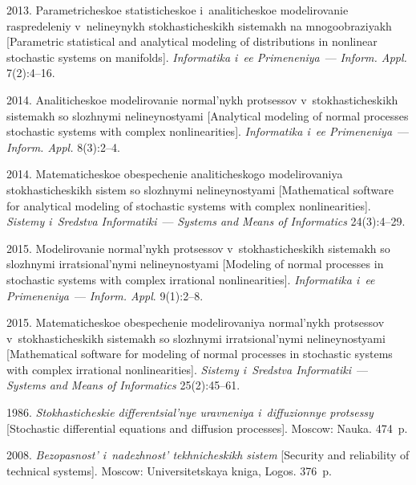 \begin{multicols}{2}
{{\begin{thebibliography}{99}
 2013.
Parametricheskoe statisticheskoe i~analiticheskoe modelirovanie raspredeleniy
v~nelineynykh stokhasticheskikh sistemakh na mnogo\-ob\-ra\-zi\-yakh [Parametric
statistical and analytical modeling of distributions in nonlinear stochastic
systems on manifolds]. \textit{Informatika i~ee Primeneniya}~---
\textit{Inform. Appl.} 7(2):4--16.


 2014.
Analiticheskoe modelirovanie normal'nykh protsessov v~sto\-kha\-sti\-che\-skikh sistemakh
so slozhnymi nelineynostyami [Analytical modeling of normal processes stochastic
systems with complex nonlinearities]. \textit{Informatika i~ee Primeneniya}~---
\textit{Inform. Appl.} 8(3):2--4.

 2014.
Matematicheskoe obespechenie analiticheskogo modelirovaniya sto\-kha\-sti\-che\-skikh
sistem so slozhnymi nelineynostyami [Mathematical software for analytical
modeling of stochastic systems with complex nonlinearities].
\textit{Sistemy i~Sredstva Informatiki}~--- \textit{Systems and Means of
Informatics}  24(3):4--29.

 2015.
Modelirovanie normal'nykh protsessov v~sto\-kha\-sti\-che\-skikh sistemakh
so slozhnymi irratsional'nymi neli\-ney\-no\-stya\-mi  [Modeling of normal processes
in stochastic systems with complex irrational
nonlinearities]. \textit{Informatika i~ee Primeneniya}~---
\textit{Inform. Appl}. 9(1):2--8.

 2015.
Ma\-te\-ma\-ti\-che\-skoe obespechenie modelirovaniya normal'nykh protsessov
v~stokhasticheskikh sistemakh so slozhnymi irratsional'nymi nelineynostyami
[Mathematical software for modeling of normal processes in stochastic systems
with complex irrational nonlinearities]. \textit{Sistemy i~Sredstva Informatiki}~---
\textit{Systems and Means of Informatics}  25(2):45--61.

 1986.
\textit{Stokhasticheskie dif\-fe\-ren\-tsi\-al'\-nye uravneniya i~diffuzionnye protsessy}
[Stochastic differential equations and diffusion processes]. Moscow:   Nauka. 474~p.

2008.
\textit{Bezopasnost' i~nadezhnost' tekhnicheskikh sistem} [Security and reliability of
technical systems].
 Moscow:  Universitetskaya kniga, Logos.  376~p.



\end{thebibliography}}}
\end{multicols}
